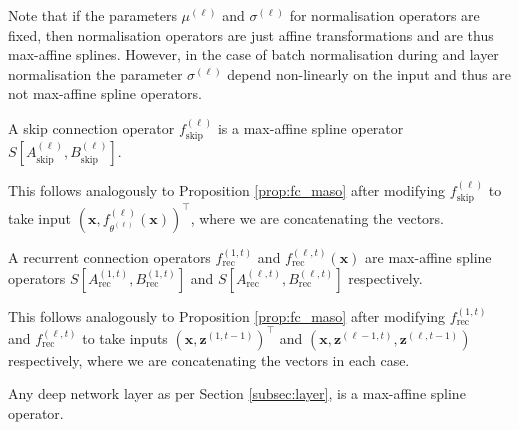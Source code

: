 Note that if the parameters $\mu^{(\ell)}$ and $\sigma^{(\ell)}$ for normalisation operators are fixed, then normalisation operators are just affine transformations and are thus max-affine splines. However, in the case of batch normalisation during and layer normalisation the parameter $\sigma^{(\ell)}$ depend non-linearly on the input and thus are not max-affine spline operators.

\begin{proposition}
    A skip connection operator $f_{\text{skip}}^{(\ell)}$ is a max-affine spline operator $S\left[A^{(\ell)}_{\text{skip}},B^{(\ell)}_{\text{skip}}\right]$.
\end{proposition}

\begin{tproof}
    This follows analogously to Proposition \ref{prop:fc_maso} after modifying $f^{(\ell)}_{\text{skip}}$ to take input $\left(\mathbf{x},f_{\theta^{(\ell)}}^{(\ell)}(\mathbf{x})\right)^\top$, where we are concatenating the vectors.
\end{tproof}

\begin{proposition}
    A recurrent connection operators $f^{(1,t)}_{\text{rec}}$ and $f_{\text{rec}}^{(\ell,t)}(\mathbf{x})$ are max-affine spline operators $S\left[A^{(1,t)}_{\text{rec}},B^{(1,t)}_{\text{rec}}\right]$ and $S\left[A^{(\ell,t)}_{\text{rec}},B^{(\ell,t)}_{\text{rec}}\right]$ respectively.
\end{proposition}

\begin{tproof}
    This follows analogously to Proposition \ref{prop:fc_maso} after modifying $f^{(1,t)}_{\text{rec}}$ and $f_{\text{rec}}^{(\ell,t)}$ to take inputs $\left(\mathbf{x},\mathbf{z}^{(1,t-1)}\right)^\top$ and $\left(\mathbf{x},\mathbf{z}^{(\ell-1,t)},\mathbf{z}^{(\ell,t-1)}\right)$ respectively, where we are concatenating the vectors in each case.
\end{tproof}

\begin{proposition}\label{prop:dn_layer_is_maso}
    Any deep network layer as per Section \ref{subsec:layer}, is a max-affine spline operator.
\end{proposition}

